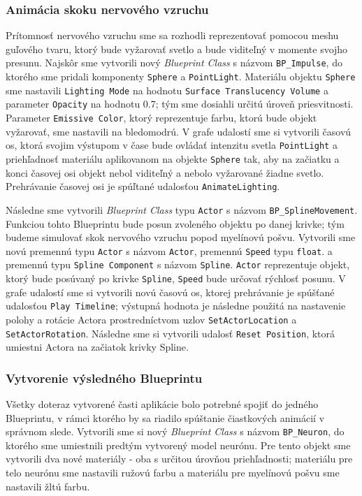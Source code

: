 \subsubsection{Animácia skoku nervového vzruchu}
Prítomnosť nervového vzruchu sme sa rozhodli reprezentovať pomocou meshu guľového tvaru, ktorý bude vyžarovať svetlo a bude viditeľný v momente svojho presunu. Najskôr sme vytvorili nový \emph{Blueprint Class} s názvom
\texttt{BP\_Impulse}, do ktorého sme pridali komponenty \texttt{Sphere} a \texttt{PointLight}. Materiálu objektu \texttt{Sphere} sme nastavili \texttt{Lighting Mode} na hodnotu \texttt{Surface Translucency Volume} a 
parameter \texttt{Opacity} na hodnotu 0.7; tým sme dosiahli určitú úroveň priesvitnosti. Parameter \texttt{Emissive Color}, ktorý reprezentuje farbu, ktorú bude objekt vyžarovať, sme nastavili na bledomodrú.
V grafe udalostí sme si vytvorili časovú os, ktorá svojim výstupom v čase bude ovládať intenzitu svetla \texttt{PointLight} a priehľadnosť materiálu aplikovanom na objekte \texttt{Sphere} tak, aby na začiatku a konci časovej 
osi objekt nebol viditeľný a nebolo vyžarované žiadne svetlo. Prehrávanie časovej osi je spúľtané udalosťou \texttt{AnimateLighting}.

Následne sme vytvorili \emph{Blueprint Class} typu \texttt{Actor} s názvom \texttt{BP\_SplineMovement}. Funkciou tohto Blueprintu bude posun zvoleného objektu po danej krivke; tým budeme simulovať skok nervového vzruchu
popod myelínovú pošvu. Vytvorili sme novú premennú typu \texttt{Actor} s názvom \texttt{Actor}, premennú \texttt{Speed} typu \texttt{float}. a premennú typu \texttt{Spline Component} s názvom \texttt{Spline}. 
\texttt{Actor} reprezentuje objekt, ktorý bude posúvaný po krivke \texttt{Spline}, \texttt{Speed} bude určovať rýchlosť posunu. V grafe udalostí sme si vytvorili novú časovú os, ktorej prehrávanie je spúšťané udalosťou
\texttt{Play Timeline}; výstupná hodnota je následne použitá na nastavenie polohy a rotácie Actora prostredníctvom uzlov \texttt{SetActorLocation} a \texttt{SetActorRotation}. Následne sme si vytvorili udalosť \texttt{Reset Position},
ktorá umiestni Actora na začiatok krivky Spline.

\subsubsection{Vytvorenie výsledného Blueprintu}
Všetky doteraz vytvorené časti aplikácie bolo potrebné spojiť do jedného Blueprintu, v rámci ktorého by sa riadilo spúštanie čiastkových animácií v správnom slede. Vytvorili sme si nový \emph{Blueprint Class} s názvom
\texttt{BP\_Neuron}, do ktorého sme umiestnili predtým vytvorený model neurónu. Pre tento objekt sme vytvorili dva nové materiály - oba s určitou úrovňou priehľadnosti; materiálu pre telo neurónu sme nastavili ružovú farbu a 
materiálu pre myelínovú pošvu sme nastavili žltú farbu.

